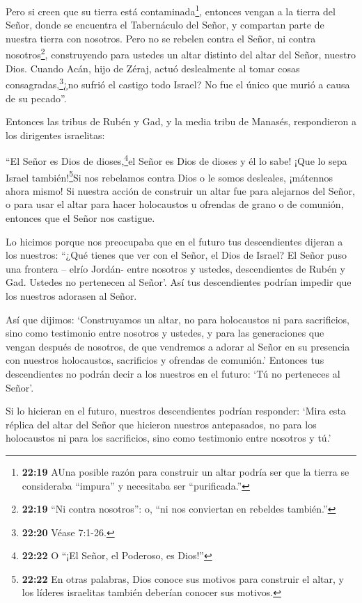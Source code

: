  Pero si creen que su tierra está contaminada\footnote{\textbf{22:19}
  AUna posible razón para construir un altar podría ser que la tierra se
  consideraba ``impura'' y necesitaba ser ``purificada.''}, entonces
vengan a la tierra del Señor, donde se encuentra el Tabernáculo del
Señor, y compartan parte de nuestra tierra con nosotros. Pero no se
rebelen contra el Señor, ni contra nosotros\footnote{\textbf{22:19} ``Ni
  contra nosotros'': o, ``ni nos conviertan en rebeldes también.''},
construyendo para ustedes un altar distinto del altar del Señor, nuestro
Dios.  Cuando Acán, hijo de Zéraj, actuó deslealmente al
tomar cosas consagradas,\footnote{\textbf{22:20} Véase 7:1-26.}¿no
sufrió el castigo todo Israel? No fue el único que murió a causa de su
pecado''.

 Entonces las tribus de Rubén y Gad, y la media tribu de
Manasés, respondieron a los dirigentes israelitas:

 ``El Señor es Dios de dioses,\footnote{\textbf{22:22} O
  ``¡El Señor, el Poderoso, es Dios!''}el Señor es Dios de dioses y él
lo sabe! ¡Que lo sepa Israel también!\footnote{\textbf{22:22} En otras
  palabras, Dios conoce sus motivos para construir el altar, y los
  líderes israelitas también deberían conocer sus motivos.}Si nos
rebelamos contra Dios o le somos desleales, ¡mátennos ahora mismo!
 Si nuestra acción de construir un altar fue para alejarnos
del Señor, o para usar el altar para hacer holocaustos u ofrendas de
grano o de comunión, entonces que el Señor nos castigue.

 Lo hicimos porque nos preocupaba que en el futuro tus
descendientes dijeran a los nuestros: ``¿Qué tienes que ver con el
Señor, el Dios de Israel?  El Señor puso una frontera --
elrío Jordán- entre nosotros y ustedes, descendientes de Rubén y Gad.
Ustedes no pertenecen al Señor'. Así tus descendientes podrían impedir
que los nuestros adorasen al Señor.

 Así que dijimos: `Construyamos un altar, no para
holocaustos ni para sacrificios,  sino como testimonio
entre nosotros y ustedes, y para las generaciones que vengan después de
nosotros, de que vendremos a adorar al Señor en su presencia con
nuestros holocaustos, sacrificios y ofrendas de comunión.' Entonces tus
descendientes no podrán decir a los nuestros en el futuro: `Tú no
perteneces al Señor'.

 Si lo hicieran en el futuro, nuestros descendientes
podrían responder: `Mira esta réplica del altar del Señor que hicieron
nuestros antepasados, no para los holocaustos ni para los sacrificios,
sino como testimonio entre nosotros y tú.'

